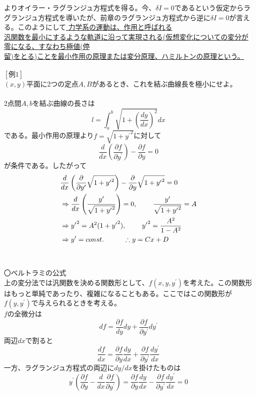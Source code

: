 \documentclass{jsarticle}
\begin{document}
よりオイラー・ラグランジュ方程式を得る。今、\(\delta I=0\)であるという仮定からラグランジュ方程式を導いたが、前章のラグランジュ方程式から逆に\(\delta I=0\)が言える。このようにして\underline{
力学系の運動は、作用と呼ばれる}\\
\underline{汎関数を最小にするような軌道に沿って実現される(仮想変化についての変分が零になる、すなわち極値(停}\\
\underline{留)をとる)ことを最小作用の原理または変分原理、ハミルトンの原理という。}\\
\\
\([例1]\)\\
\((x,y)\)平面に2つの定点\(A,B\)があるとき、これを結ぶ曲線長を極小にせよ。\\
\\
2点間\(A,b\)を結ぶ曲線の長さは
\[l=\int_{a}^{b}\sqrt{1+\left(\frac{dy}{dx}\right)^{2}}dx\]
である。最小作用の原理より\(f=\sqrt{1+{y^{\prime}}^{2}}\)に対して
\[\frac{d}{dx}\left(\frac{\partial f}{\partial y^{\prime}}\right)-\frac{\partial f}{\partial y}=0\]
が条件である。したがって
\begin{align*}
&\frac{d}{dx}\left(\frac{\partial}{\partial y^{\prime}}\sqrt{1+{y^{\prime}}^{2}}\right)-\frac{\partial}{\partial y}\sqrt{1+{y^{\prime}}^{2}}=0\\
&\Rightarrow\frac{d}{dx}\left(\frac{y^{\prime}}{\sqrt{1+{y^{\prime}}^{2}}}\right)=0,\hspace{8mm}\frac{y^{\prime}}{\sqrt{1+{y^{\prime}}^{2}}}=A\\
&\Rightarrow {y^{\prime}}^{2}=A^{2}(1+{y^{\prime}}^{2}),\hspace{8mm}{y^{\prime}}^{2}=\frac{A^{2}}{1-A^{2}}\\
&\Rightarrow y^{\prime}=const.\hspace{10mm}\therefore y=Cx+D
\end{align*}\\
\\
〇ベルトラミの公式\\
上の変分法では汎関数を決める関数形として、\(f(x,y,y^{\prime})\)を考えた。この関数形はもっと単純であったり、複雑になることもある。ここではこの関数形が\(f(y,y^{\prime})\)で与えられるときを考える。\\
\(f\)の全微分は
\[df=\frac{\partial f}{dy}dy+\frac{\partial f}{\partial y^{\prime}}dy^{\prime}\]
両辺\(dx\)で割ると
\[\frac{df}{dx}=\frac{\partial f}{\partial y}\frac{dy}{dx}+\frac{\partial f}{\partial y^{\prime}}\frac{d y^{\prime}}{dx}\]
一方、ラグランジュ方程式の両辺に\(dy/dx\)を掛けたものは
\[y^{\prime}\left(\frac{\partial f}{\partial y}-\frac{d}{dx}\frac{\partial f}{\partial y^{\prime}}\right)=\frac{\partial f}{\partial y}\frac{dy}{dx}-\frac{\partial f}{\partial y^{\prime}}\frac{d y^{\prime}}{dx}=0\]
\end{document}
